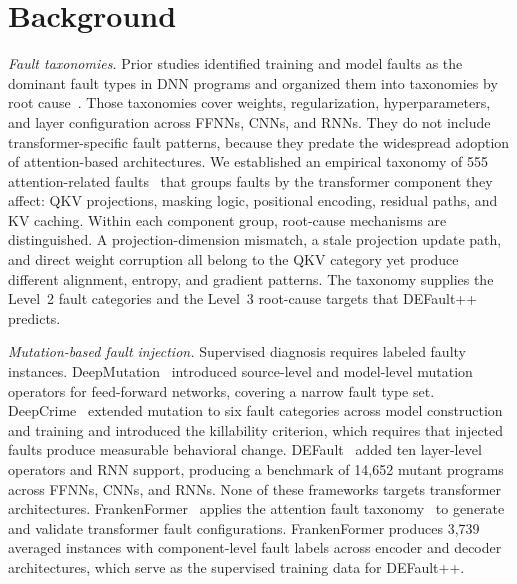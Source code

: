 \section{Background}
\label{sec:defaultpp_background}

\textit{Fault taxonomies.} Prior studies identified training and model faults as the dominant fault types in DNN programs and organized them into taxonomies by root cause~\cite{faulttaxonomy,dlbugcharacterstics}. Those taxonomies cover weights, regularization, hyperparameters, and layer configuration across FFNNs, CNNs, and RNNs. They do not include transformer-specific fault patterns, because they predate the widespread adoption of attention-based architectures. We established an empirical taxonomy of 555 attention-related faults~\cite{attention_taxonomy} that groups faults by the transformer component they affect: QKV projections, masking logic, positional encoding, residual paths, and KV caching. Within each component group, root-cause mechanisms are distinguished. A projection-dimension mismatch, a stale projection update path, and direct weight corruption all belong to the QKV category yet produce different alignment, entropy, and gradient patterns. The taxonomy supplies the Level~2 fault categories and the Level~3 root-cause targets that DEFault++ predicts.

\textit{Mutation-based fault injection.} Supervised diagnosis requires labeled faulty instances. DeepMutation~\cite{deepmutation} introduced source-level and model-level mutation operators for feed-forward networks, covering a narrow fault type set. DeepCrime~\cite{deepcrime} extended mutation to six fault categories across model construction and training and introduced the killability criterion, which requires that injected faults produce measurable behavioral change. DEFault~\cite{default} added ten layer-level operators and RNN support, producing a benchmark of 14{,}652 mutant programs across FFNNs, CNNs, and RNNs. None of these frameworks targets transformer architectures. FrankenFormer~\cite{frankenformer} applies the attention fault taxonomy~\cite{attention_taxonomy} to generate and validate transformer fault configurations. FrankenFormer produces 3{,}739 averaged instances with component-level fault labels across encoder and decoder architectures, which serve as the supervised training data for DEFault++.

